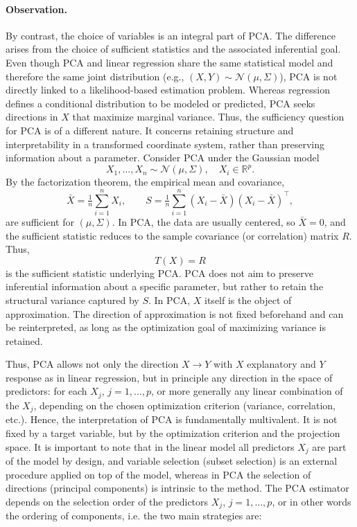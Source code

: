 \paragraph{Observation.}
By contrast, the choice of variables is an integral part of PCA. The difference arises from the choice of sufficient statistics and the associated inferential goal. Even though PCA and linear regression share the same statistical model and therefore the same joint distribution (e.g., $(X,Y) \sim \mathcal{N}(\mu, \Sigma)$), PCA is not directly linked to a likelihood-based estimation problem. Whereas regression defines a conditional distribution to be modeled or predicted, PCA seeks directions in $X$ that maximize marginal variance. Thus, the sufficiency question for PCA is of a different nature. It concerns retaining structure and interpretability in a transformed coordinate system, rather than preserving information about a parameter. Consider PCA under the Gaussian model
\[
X_1,\dots,X_n \sim \mathcal{N}(\mu, \Sigma), \quad X_i \in \mathbb{R}^p.
\]
By the factorization theorem, the empirical mean and covariance,
\[
\bar{X} = \tfrac{1}{n} \sum_{i=1}^n X_i,
\qquad
S = \tfrac{1}{n}\sum_{i=1}^n (X_i - \bar{X})(X_i - \bar{X})^\top,
\]
are sufficient for $(\mu,\Sigma)$. In PCA, the data are usually centered, so $\bar{X} = 0$, and the sufficient statistic reduces to the sample covariance (or correlation) matrix $R$. Thus,
\[
T(X) = R
\]
is the sufficient statistic underlying PCA. PCA does not aim to preserve inferential information about a specific parameter, but rather to retain the structural variance captured by $S$. In PCA, $X$ itself is the object of approximation. The direction of approximation is not fixed beforehand and can be reinterpreted, as long as the optimization goal of maximizing variance is retained. 

Thus, PCA allows not only the direction $X \to Y$ with $X$ explanatory and $Y$ response as in linear regression, but in principle any direction in the space of predictors: for each $X_j$, $j=1,\dots,p$, or more generally any linear combination of the $X_j$, depending on the chosen optimization criterion (variance, correlation, etc.). Hence, the interpretation of PCA is fundamentally multivalent. It is not fixed by a target variable, but by the optimization criterion and the projection space. It is important to note that in the linear model all predictors \(X_j\) are part of the model by design, and variable selection (subset selection) is an external procedure applied on top of the model, whereas in PCA the selection of directions (principal components) is intrinsic to the method. The PCA estimator depends on the selection order of the predictors $X_j$, $j = 1, \dots, p$, or in other words the ordering of components, i.e. the two main strategies are:


